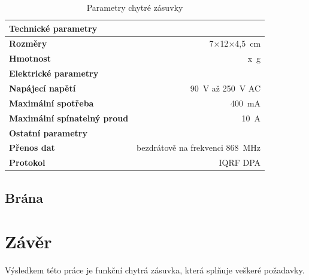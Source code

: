 \documentclass[12pt,a4paper,oneside]{article}
\begin{document}
\begin{table}[H]
	\centering
	\begin{tabular}{lr}
		\hline 
		\textbf{Technické parametry} & ~ \\ 
		\hline 
		\hline 
		\textbf{Rozměry} & 7$\times$12$\times$4,5~cm \\ 
		\textbf{Hmotnost} & x~g \\ 
		\hline
		\textbf{Elektrické parametry} \\ 
		\hline 
		\hline 
		\textbf{Napájecí napětí} & 90~V až 250~V AC \\ 
		\textbf{Maximální spotřeba} & 400~mA \\ 
		\textbf{Maximální spínatelný proud} &  10~A \\ 
		\hline 
		\textbf{Ostatní parametry} \\ 
		\hline 
		\hline 
		\textbf{Přenos dat} & bezdrátově na frekvenci 868~MHz \\ 
		\textbf{Protokol} & IQRF DPA \\ 
	\end{tabular}
	\caption{Parametry chytré zásuvky}\label{table:parametry/chytra-zasuvka}
\end{table}

\subsection{Brána}

\newpage

\section*{Závěr}


Výsledkem této práce je funkční chytrá zásuvka, která splňuje veškeré požadavky.

\newpage

\printindex[zkr]


\newpage
\end{document}

